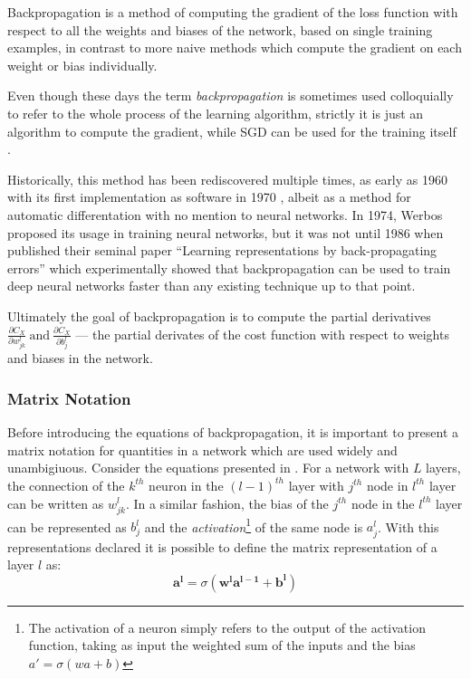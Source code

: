 Backpropagation is a method of computing the gradient of the loss function
with respect to all the weights and biases of the network, based on single
training examples, in contrast to more naive methods which compute the gradient
on each weight or bias individually.

Even though these days the term \textit{backpropagation} is sometimes
used colloquially to refer to the whole process of the learning algorithm,
strictly it is just an algorithm to compute the gradient, while SGD can be
used for the training itself \cite{book:Goodfellow}.

Historically, this method has been rediscovered multiple times, as early
as 1960 \cite{article:SCHMID} with its first implementation as
software in 1970 \cite[p.~229]{book:Goodfellow}, albeit as a method
for automatic differentation with no mention to neural networks. In
1974, Werbos proposed its usage in training neural
networks\cite{book:WerbosBackprop}, but it was not until 1986 when
\citet*{article:backprop} published their seminal paper ``Learning
representations by back-propagating errors'' which experimentally
showed that backpropagation can be used to train deep neural networks
faster than any existing technique up to that point.


Ultimately the goal of backpropagation is to compute the partial
derivatives $\frac{\partial C_X}{\partial w^l_{jk}} ~\text{and}~ \frac{\partial
  C_X}{\partial b^l_{j}}$ --- the partial derivates of the cost function
 with respect to weights and biases in the network.


\subsubsection*{Matrix Notation}

Before introducing the equations of backpropagation, it is
important to present a matrix notation for quantities in a
network which are used widely and unambigiuous. Consider the
equations presented in . For a network
with $L$ layers, the connection of the $k^{th}$ neuron in the
$(l-1)^{th}$ layer with $j^{th}$ node in $l^{th}$ layer can be
written as $w_{jk}^l$. In a similar fashion, the bias of the
$j^{th}$ node in the $l^{th}$ layer can be represented as $b^l_j$
and the \textit{activation}\footnote{The activation of a neuron
  simply refers to the output of the activation function, taking as
  input the weighted sum of the inputs and the bias $a' = \sigma(wa +
  b)$
} of the same node is $a_j^l$. With this representations declared
it is possible to define the matrix representation of a layer $l$ as:
\begin{equation}
  \label{eq:layer}
  \bm{a^l} = \sigma(\bm{w^l} \bm{a^{l-1}} + \bm{b^l})
\end{equation}

